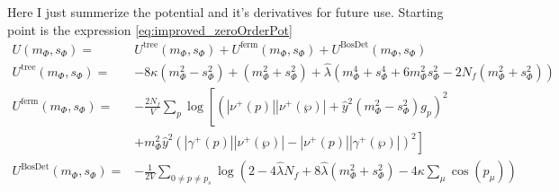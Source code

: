 Here I just summerize the potential and it's derivatives for future use. Starting point is the expression \eqref{eq:improved_zeroOrderPot}
\begin{align}\label{eq:CEP_shortCut}
 U(m_{\Phi}, s_{\Phi}) =& U^{\text{tree}}(m_{\Phi}, s_{\Phi}) + U^{\text{ferm}}(m_{\Phi}, s_{\Phi}) + U^{\text{BosDet}}(m_{\Phi}, s_{\Phi}) 
              \\ \label{CEP_treeLevel}
 U^{\text{tree}}(m_{\Phi}, s_{\Phi}) =& -8 \kappa \left( m_{\Phi}^2 - s_{\Phi}^2 \right)   +   \left( m_{\Phi}^2 + s_{\Phi}^2 \right)
                         + \hat\lambda \left( m_{\Phi}^4 + s_{\Phi}^4 + 6 m_{\Phi}^2 s_{\Phi}^2 - 2 N_f \left(m_{\Phi}^2 + s_{\Phi}^2 \right) \right) 
              \\ \label{eq:CEP_ferionicContribution}
 U^{\text{ferm}}(m_{\Phi}, s_{\Phi}) =& -\frac{2N_f}{V} \sum\limits_p \log
                                    \left[ \left( |\nu^+(p)| |\nu^+(\wp)|   +
                                    \hat y ^2 \left( m_{\Phi}^2 - s_{\Phi}^2 \right) g_p\right)^2 
                                              \nonumber \right. \\ 
                        & \left. +  m_{\Phi}^2 \hat y^2 \left( |\gamma^+(p)| |\nu^+(\wp)|   -   |\nu^+(p)| |\gamma^+(\wp)| \right)^2\right] 
                                              \\ \label{eq:CEP_bosonicDeterminantContribution}
 U^{\text{BosDet}}(m_{\Phi}, s_{\Phi}) =& - \frac{1}{2V}\sum\limits_{0 \neq p \neq p_s} 
          \log\left( 2 - 4 \hat\lambda N_f + 8 \hat\lambda \left( m_{\Phi}^2 + s_{\Phi}^2  \right) - 4 \kappa \sum_{\mu} \cos(p_{\mu}) \right)
\end{align}

